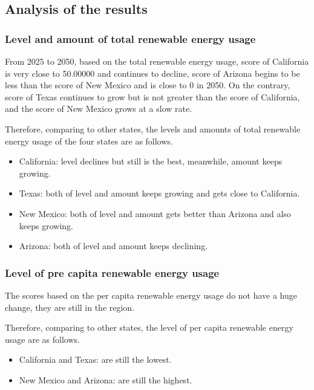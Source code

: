 \documentclass[a4paper,11pt]{article}
\begin{document}
\subsection{Analysis of the results}
\subsubsection{Level and amount of total renewable energy usage}
\par From 2025 to 2050, based on the total renewable energy usage, score of California is very close to 50.00000 and continues to decline, score of Arizona begins to be less than the score of New Mexico and is close to 0 in 2050. On the contrary, score of Texas continues to grow but is not greater than the score of California, and the score of New Mexico grows at a slow rate.
\par Therefore, comparing to other states, the levels and amounts of total renewable energy usage of the four states are as follows.
\begin{itemize}
    \item California: level declines but still is the best, meanwhile, amount keeps growing.
    \item Texas: both of level and amount keeps growing and gets close to California.
    \item New Mexico: both of level and amount gets better than Arizona and also keeps growing.
    \item Arizona: both of level and amount keeps declining.
\end{itemize}
\subsubsection{Level of pre capita renewable energy usage}
\par The scores based on the per capita renewable energy usage do not have a huge change, they are still in the region.
\par Therefore, comparing to other states, the level of per capita renewable energy usage are as follows.
\begin{itemize}
    \item California and Texas: are still the lowest.
    \item New Mexico and Arizona: are still the highest.
\end{itemize}
\end{document}
